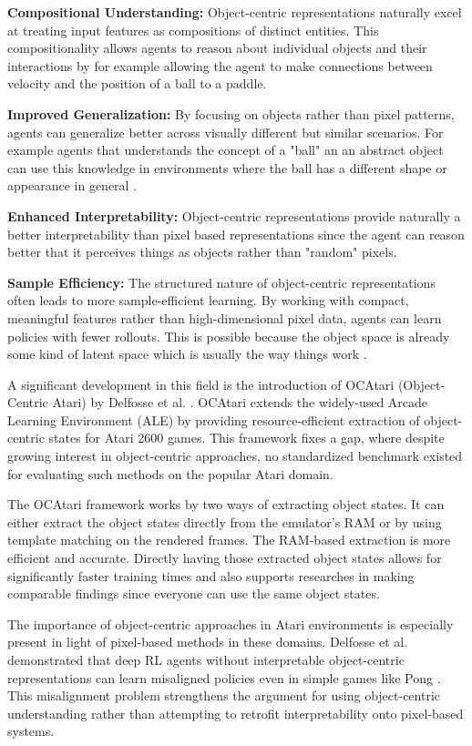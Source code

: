 \documentclass[
	english,
	ruledheaders=section,
	class=report,
	thesis={type=master},
	accentcolor=9c,
	custommargins=true,
	marginpar=false,
	parskip=half-,
	fontsize=11pt,
]{tudapub}
\begin{document}
\textbf{Compositional Understanding:} Object-centric representations naturally excel at treating input features as compositions of distinct entities.
This compositionality allows agents to reason about individual objects and their interactions by for example allowing the agent
to make connections between velocity and the position of a ball to a paddle.

\textbf{Improved Generalization:} By focusing on objects rather than pixel patterns, agents can generalize better across visually different but similar scenarios. For example agents that
understands the concept of a "ball" an an abstract object can use this knowledge in environments where the ball has a different shape or appearance in general \cite{zambaldi2018deep}.

\textbf{Enhanced Interpretability:} Object-centric representations provide naturally a better interpretability than pixel based representations since the agent can reason better that it perceives things as objects rather than "random" pixels.

\textbf{Sample Efficiency:} The structured nature of object-centric representations often leads to more sample-efficient learning. By working with compact, meaningful features rather than high-dimensional
pixel data, agents can learn policies with fewer rollouts. This is possible because the object space is already some kind of latent space which is usually the way things work \cite{locatello2020object}.

A significant development in this field is the introduction of OCAtari
(Object-Centric Atari) by Delfosse et al. \cite{delfosse2023ocatari}. OCAtari
extends the widely-used Arcade Learning Environment (ALE) by providing
resource-efficient extraction of object-centric states for Atari 2600 games.
This framework fixes a gap, where despite growing interest in object-centric
approaches, no standardized benchmark existed for evaluating such methods on
the popular Atari domain.

The OCAtari framework works by two ways of extracting object states. It can
either extract the object states directly from the emulator's RAM or by using
template matching on the rendered frames. The RAM-based extraction is more
efficient and accurate. Directly having those extracted object states allows
for significantly faster training times and also supports researches in making
comparable findings since everyone can use the same object states.

The importance of object-centric approaches in Atari environments is especially
present in light of pixel-based methods in these domains. Delfosse et al.
demonstrated that deep RL agents without interpretable object-centric
representations can learn misaligned policies even in simple games like Pong
\cite{delfosse2023ocatari}. This misalignment problem strengthens the argument
for using object-centric understanding rather than attempting to retrofit
interpretability onto pixel-based systems.
\end{document}
